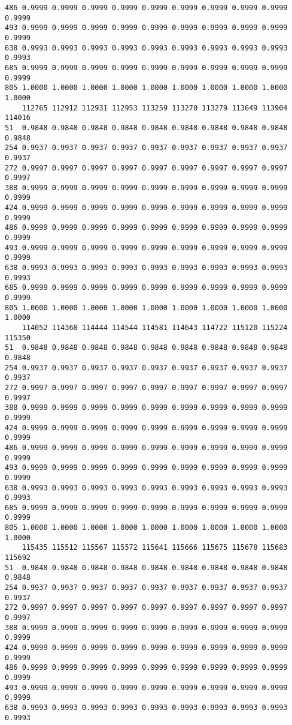 \documentclass[
]{report}
\begin{document}
\begin{verbatim}
486 0.9999 0.9999 0.9999 0.9999 0.9999 0.9999 0.9999 0.9999 0.9999 0.9999
493 0.9999 0.9999 0.9999 0.9999 0.9999 0.9999 0.9999 0.9999 0.9999 0.9999
638 0.9993 0.9993 0.9993 0.9993 0.9993 0.9993 0.9993 0.9993 0.9993 0.9993
685 0.9999 0.9999 0.9999 0.9999 0.9999 0.9999 0.9999 0.9999 0.9999 0.9999
805 1.0000 1.0000 1.0000 1.0000 1.0000 1.0000 1.0000 1.0000 1.0000 1.0000
    112765 112912 112931 112953 113259 113270 113279 113649 113904 114016
51  0.9848 0.9848 0.9848 0.9848 0.9848 0.9848 0.9848 0.9848 0.9848 0.9848
254 0.9937 0.9937 0.9937 0.9937 0.9937 0.9937 0.9937 0.9937 0.9937 0.9937
272 0.9997 0.9997 0.9997 0.9997 0.9997 0.9997 0.9997 0.9997 0.9997 0.9997
388 0.9999 0.9999 0.9999 0.9999 0.9999 0.9999 0.9999 0.9999 0.9999 0.9999
424 0.9999 0.9999 0.9999 0.9999 0.9999 0.9999 0.9999 0.9999 0.9999 0.9999
486 0.9999 0.9999 0.9999 0.9999 0.9999 0.9999 0.9999 0.9999 0.9999 0.9999
493 0.9999 0.9999 0.9999 0.9999 0.9999 0.9999 0.9999 0.9999 0.9999 0.9999
638 0.9993 0.9993 0.9993 0.9993 0.9993 0.9993 0.9993 0.9993 0.9993 0.9993
685 0.9999 0.9999 0.9999 0.9999 0.9999 0.9999 0.9999 0.9999 0.9999 0.9999
805 1.0000 1.0000 1.0000 1.0000 1.0000 1.0000 1.0000 1.0000 1.0000 1.0000
    114052 114368 114444 114544 114581 114643 114722 115120 115224 115350
51  0.9848 0.9848 0.9848 0.9848 0.9848 0.9848 0.9848 0.9848 0.9848 0.9848
254 0.9937 0.9937 0.9937 0.9937 0.9937 0.9937 0.9937 0.9937 0.9937 0.9937
272 0.9997 0.9997 0.9997 0.9997 0.9997 0.9997 0.9997 0.9997 0.9997 0.9997
388 0.9999 0.9999 0.9999 0.9999 0.9999 0.9999 0.9999 0.9999 0.9999 0.9999
424 0.9999 0.9999 0.9999 0.9999 0.9999 0.9999 0.9999 0.9999 0.9999 0.9999
486 0.9999 0.9999 0.9999 0.9999 0.9999 0.9999 0.9999 0.9999 0.9999 0.9999
493 0.9999 0.9999 0.9999 0.9999 0.9999 0.9999 0.9999 0.9999 0.9999 0.9999
638 0.9993 0.9993 0.9993 0.9993 0.9993 0.9993 0.9993 0.9993 0.9993 0.9993
685 0.9999 0.9999 0.9999 0.9999 0.9999 0.9999 0.9999 0.9999 0.9999 0.9999
805 1.0000 1.0000 1.0000 1.0000 1.0000 1.0000 1.0000 1.0000 1.0000 1.0000
    115435 115512 115567 115572 115641 115666 115675 115678 115683 115692
51  0.9848 0.9848 0.9848 0.9848 0.9848 0.9848 0.9848 0.9848 0.9848 0.9848
254 0.9937 0.9937 0.9937 0.9937 0.9937 0.9937 0.9937 0.9937 0.9937 0.9937
272 0.9997 0.9997 0.9997 0.9997 0.9997 0.9997 0.9997 0.9997 0.9997 0.9997
388 0.9999 0.9999 0.9999 0.9999 0.9999 0.9999 0.9999 0.9999 0.9999 0.9999
424 0.9999 0.9999 0.9999 0.9999 0.9999 0.9999 0.9999 0.9999 0.9999 0.9999
486 0.9999 0.9999 0.9999 0.9999 0.9999 0.9999 0.9999 0.9999 0.9999 0.9999
493 0.9999 0.9999 0.9999 0.9999 0.9999 0.9999 0.9999 0.9999 0.9999 0.9999
638 0.9993 0.9993 0.9993 0.9993 0.9993 0.9993 0.9993 0.9993 0.9993 0.9993

\end{verbatim}
\end{document}
